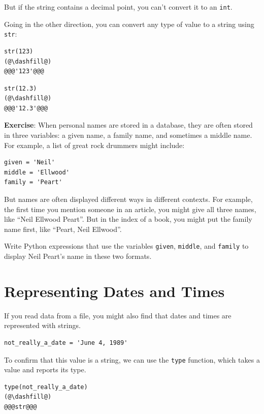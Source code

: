 But if the string contains a decimal point, you can't convert it to an
\passthrough{\lstinline!int!}.

Going in the other direction, you can convert any type of value to a
string using \passthrough{\lstinline!str!}:

\begin{lstlisting}[]
str(123)
(@\dashfill@)
@@@'123'@@@
\end{lstlisting}

\begin{lstlisting}[]
str(12.3)
(@\dashfill@)
@@@'12.3'@@@
\end{lstlisting}

\textbf{Exercise}: When personal names are stored in a database, they
are often stored in three variables: a given name, a family name, and
sometimes a middle name. For example, a list of great rock drummers
might include:

\begin{lstlisting}[]
given = 'Neil'
middle = 'Ellwood'
family = 'Peart'
\end{lstlisting}

But names are often displayed different ways in different contexts. For
example, the first time you mention someone in an article, you might
give all three names, like ``Neil Ellwood Peart''. But in the index of a
book, you might put the family name first, like ``Peart, Neil Ellwood''.

Write Python expressions that use the variables
\passthrough{\lstinline!given!}, \passthrough{\lstinline!middle!}, and
\passthrough{\lstinline!family!} to display Neil Peart's name in these
two formats.

\hypertarget{representing-dates-and-times}{%
\section{Representing Dates and
Times}\label{representing-dates-and-times}}

If you read data from a file, you might also find that dates and times
are represented with strings.

\begin{lstlisting}[]
not_really_a_date = 'June 4, 1989'
\end{lstlisting}

To confirm that this value is a string, we can use the
\passthrough{\lstinline!type!} function, which takes a value and reports
its type.

\begin{lstlisting}[]
type(not_really_a_date)
(@\dashfill@)
@@@str@@@
\end{lstlisting}

